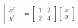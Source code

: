 \documentclass[letterpaper, fontsize=12pt]{scrartcl} %
\numberwithin{equation}{section} %
\numberwithin{figure}{section} %
\numberwithin{table}{section} %
\begin{document}
\begin{enumerate}
\begin{enumerate}[label=(\alph*)]
\[ \begin{bmatrix} x' \\ y'  \end{bmatrix} = \begin{bmatrix} 1 & 2 \\ 2 & 4 \end{bmatrix} \begin{bmatrix} x \\ y \end{bmatrix} \]
%
%
%


\end{enumerate}
\end{enumerate}
\end{document}
